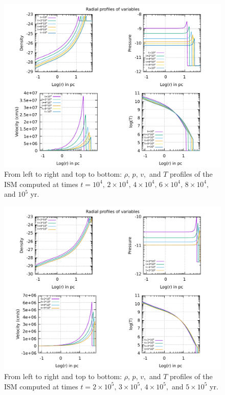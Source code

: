 \documentclass{article}
\begin{document}
\begin{figure}[H] 
	\centering
	\includegraphics[width=1 \linewidth]{radialprofiles.pdf}
	\caption{From left to right and top to bottom: $\rho,\,p,\,v,$ and $T$ profiles of the ISM computed at times $t=10^4,\,2\times10^4,\,4\times10^4,\,6\times10^4,\,8\times 10^4,$ and $10^5$ yr.}

	\label{fig:radialpr}
\end{figure}
\begin{figure}[H]
	\centering
	\includegraphics[width=1 \linewidth]{radialprofileshight.pdf}
	\caption{From left to right and top to bottom: $\rho,\,p,\,v,$ and $T$ profiles of the ISM computed at times $t=2\times10^5,\,3\times10^5,\,4\times10^5,$ and $5\times10^5$ yr.}

	\label{fig:radialprhight}
\end{figure}
\end{document}
